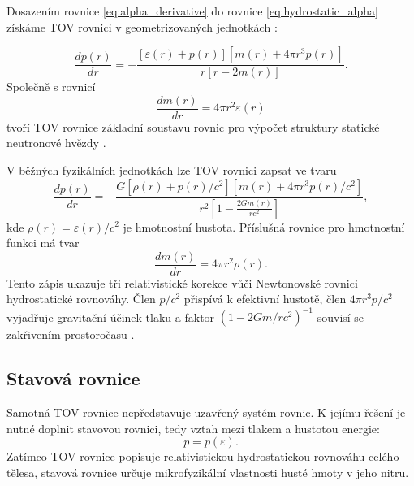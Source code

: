 \documentclass[%
final%
,htext%
]{ipothes}
\begin{document}
Dosazením rovnice \eqref{eq:alpha_derivative} do rovnice \eqref{eq:hydrostatic_alpha} získáme TOV rovnici v geometrizovaných jednotkách \cite{tolman1939,oppenheimer1939}:

\begin{equation}
    \frac{dp(r)}{dr}
    =
    -
    \frac{
    \left[\varepsilon(r)+p(r)\right]
    \left[m(r)+4\pi r^3 p(r)\right]
    }
    {
    r\left[r-2m(r)\right]
    }.
    \label{eq:tov_geometrized}
\end{equation}
Společně s rovnicí
\begin{equation}
    \frac{dm(r)}{dr}
    =
    4\pi r^2 \varepsilon(r)
    \label{eq:tov_mass_geometrized}
\end{equation}
tvoří TOV rovnice základní soustavu rovnic pro výpočet struktury statické neutronové hvězdy \cite{vidana2020}.

V běžných fyzikálních jednotkách lze TOV rovnici zapsat ve tvaru
\begin{equation}
    \frac{dp(r)}{dr}
    =
    -
    \frac{
    G\left[\rho(r)+p(r)/c^2\right]
    \left[m(r)+4\pi r^3 p(r)/c^2\right]
    }
    {
    r^2
    \left[
    1-\frac{2Gm(r)}{rc^2}
    \right]
    },
    \label{eq:tov_physical_units}
\end{equation}
kde $\rho(r)=\varepsilon(r)/c^2$ je hmotnostní hustota. Příslušná rovnice pro hmotnostní funkci má tvar
\begin{equation}
    \frac{dm(r)}{dr}
    =
    4\pi r^2 \rho(r).
    \label{eq:mass_physical_units}
\end{equation}
Tento zápis ukazuje tři relativistické korekce vůči Newtonovské rovnici hydrostatické rovnováhy. Člen $p/c^2$ přispívá k efektivní hustotě, člen $4\pi r^3p/c^2$ vyjadřuje gravitační účinek tlaku a faktor $\left(1-2Gm/rc^2\right)^{-1}$ souvisí se zakřivením prostoročasu \cite{ghosh2007}.



\subsection{Stavová rovnice}

Samotná TOV rovnice nepředstavuje uzavřený systém rovnic. K jejímu řešení je nutné doplnit stavovou rovnici, tedy vztah mezi tlakem a hustotou energie:
\begin{equation}
    p = p(\varepsilon).
    \label{eq:eos_general}
\end{equation}
Zatímco TOV rovnice popisuje relativistickou hydrostatickou rovnováhu celého tělesa, stavová rovnice určuje mikrofyzikální vlastnosti husté hmoty v jeho nitru.
\end{document}
